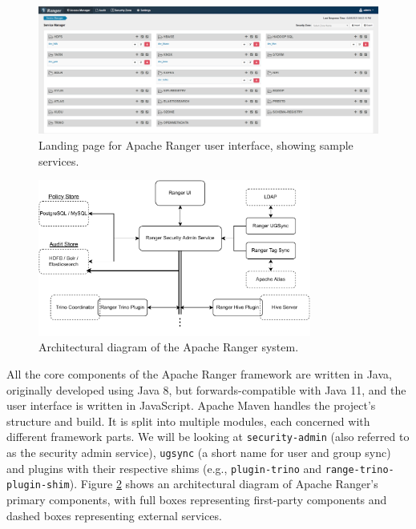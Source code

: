 \begin{figure}
    \centering
    \includegraphics[width=\textwidth]{chapters/tech_background/figures/ranger-admin.png}
    \caption{Landing page for Apache Ranger user interface, showing sample services.}
    \label{fig:ranger-admin}
\end{figure}

\begin{figure}
    \centering
    \includegraphics[width=0.8\textwidth]{chapters/tech_background/figures/ranger-arch.pdf}
    \caption{Architectural diagram of the Apache Ranger system.}
    \label{fig:rager_arch}
\end{figure}

All the core components of the Apache Ranger framework are written in Java, originally developed using Java 8, but forwards-compatible with Java 11, and the user interface is written in JavaScript. Apache Maven handles the project's structure and build. It is split into multiple modules, each concerned with different framework parts. We will be looking at \texttt{security-admin} (also referred to as the security admin service), \texttt{ugsync} (a short name for user and group sync) and plugins with their respective shims (e.g., \texttt{plugin-trino} and \texttt{range-trino-plugin-shim}). Figure \ref{fig:rager_arch} shows an architectural diagram of Apache Ranger's primary components, with full boxes representing first-party components and dashed boxes representing external services.

